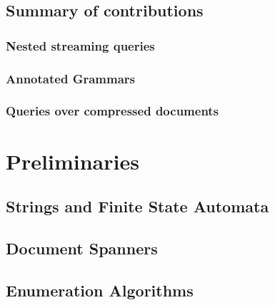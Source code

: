 \documentclass[pdftex]{pucthesis}	%
\begin{document}


\section{Summary of contributions}

\subsection{Nested streaming queries}



\subsection{Annotated Grammars}



\subsection{Queries over compressed documents}





\chapter[PRELIMINARIES]{Preliminaries}



\section{Strings and Finite State Automata}



\section{Document Spanners}\label{prelims:sec:spanners}



\section{Enumeration Algorithms}\label{prelims:sec:enum}


\end{document}
